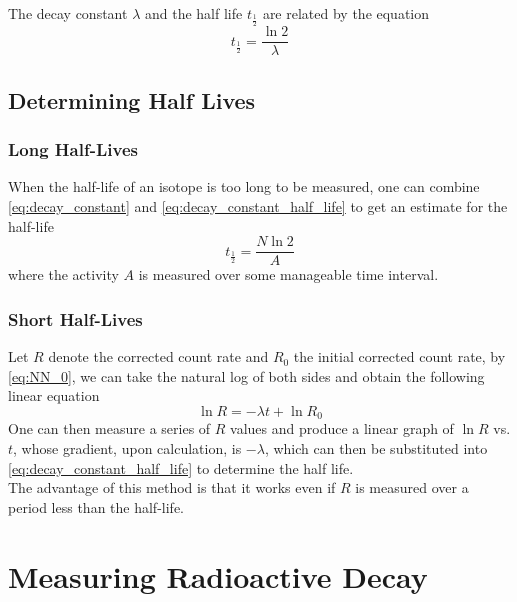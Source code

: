 \documentclass[a4paper,12pt]{article}
\let\oldsection\section
\renewcommand\section{\clearpage\oldsection}
\newcommand{\lb}{\\[8pt]}
\begin{document}
The decay constant $\lambda$ and the half life $t_{\frac{1}{2}}$ are related by the equation \begin{equation}\label{eq:decay_constant_half_life}
  t_{\frac{1}{2}} = \frac{\ln 2}{\lambda}
\end{equation}

\pagebreak

\subsection{Determining Half Lives}

\subsubsection{Long Half-Lives}

When the half-life of an isotope is too long to be measured, one can combine \cref{eq:decay_constant} and \cref{eq:decay_constant_half_life} to get an estimate for the half-life \begin{equation}\label{eq:long_half_life}
  t_{\frac{1}{2}} = \frac{N\ln 2}{A}
\end{equation}
where the activity $A$ is measured over some manageable time interval.

\subsubsection{Short Half-Lives}

Let $R$ denote the corrected count rate and $R_0$ the initial corrected count rate, by \cref{eq:NN_0}, we can take the natural log of both sides and obtain the following linear equation
$$\ln R = -\lambda t + \ln R_0$$
One can then measure a series of $R$ values and produce a linear graph of $\ln R$ vs. $t$, whose gradient, upon calculation, is $-\lambda$, which can then be substituted into \cref{eq:decay_constant_half_life} to determine the half life.\lb
The advantage of this method is that it works even if $R$ is measured over a period less than the half-life.

\section{Measuring Radioactive Decay}
\end{document}
